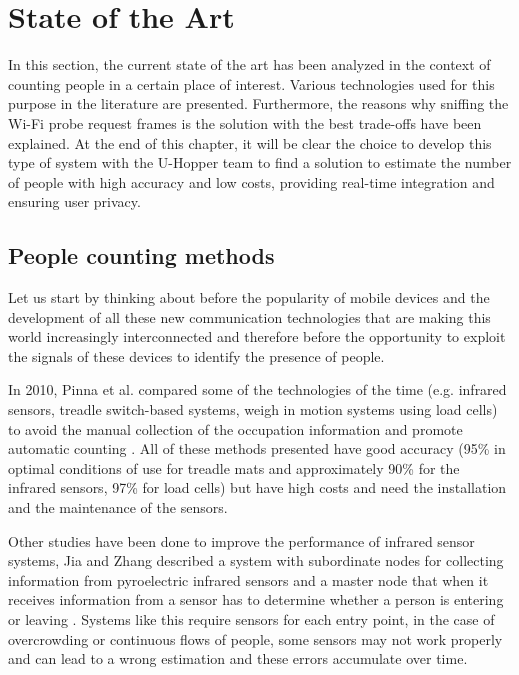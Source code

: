 \chapter{State of the Art}
\label{cha:soa}
\vspace{0.5 cm} 

In this section, the current state of the art has been analyzed in the context of counting people in a certain place of interest. Various technologies used for this purpose in the literature are presented. Furthermore, the reasons why sniffing the Wi-Fi probe request frames is the solution with the best trade-offs have been explained. At the end of this chapter, it will be clear the choice to develop this type of system with the U-Hopper team to find a solution to estimate the number of people with high accuracy and low costs, providing real-time integration and ensuring user privacy.


\section{People counting methods}
\label{sec:count}
\vspace{0.2 cm} 

Let us start by thinking about before the popularity of mobile devices and the development of all these new communication technologies that are making this world increasingly interconnected and therefore before the opportunity to exploit the signals of these devices to identify the presence of people.

In 2010, Pinna et al. compared some of the technologies of the time  (e.g. infrared sensors, treadle switch-based systems, weigh in motion systems using load cells) to avoid the manual collection of the occupation information and promote automatic counting \cite{pinna2010automatic}. All of these methods presented have good accuracy  (95\% in optimal conditions of use for treadle mats and approximately 90\% for the infrared sensors, 97\% for load cells) but have high costs and need the installation and the maintenance of the sensors.

Other studies have been done to improve the performance of infrared sensor systems, Jia and Zhang described a system with subordinate nodes for collecting information from pyroelectric infrared sensors and a master node that when it receives information from a sensor has to determine whether a person is entering or leaving \cite{jia2015application}. 
Systems like this require sensors for each entry point, in the case of overcrowding or continuous flows of people, some sensors may not work properly and can lead to a wrong estimation and these errors accumulate over time.

